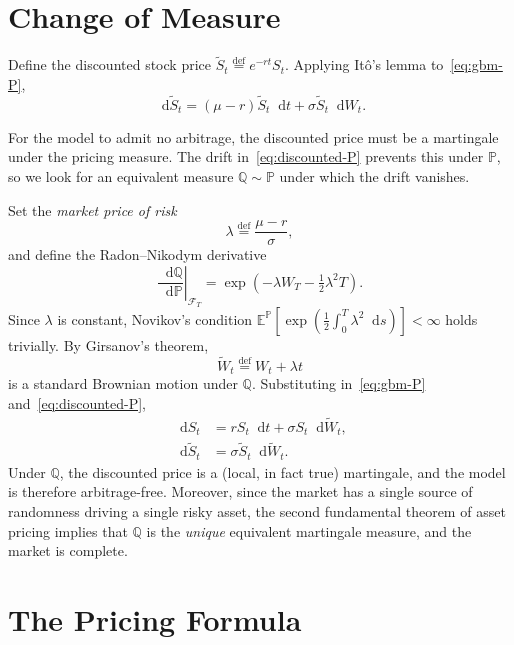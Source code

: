 \documentclass[11pt,a4paper]{article}
\theoremstyle{plain}
\theoremstyle{definition}
\theoremstyle{remark}
\newcommand{\E}{\mathbb{E}}
\newcommand{\F}{\mathcal{F}}
\newcommand{\Prob}{\mathbb{P}}
\newcommand{\Q}{\mathbb{Q}}
\newcommand{\dd}{\mathop{}\!\mathrm{d}}
\newcommand{\eqdef}{\overset{\mathrm{def}}{=}}
\begin{document}
\section{Change of Measure}

Define the discounted stock price \(\tilde{S}_t \eqdef e^{-rt} S_t\).
Applying It\^{o}'s lemma to~\eqref{eq:gbm-P},
\begin{equation}
    \dd \tilde{S}_t
    = (\mu - r) \tilde{S}_t \dd t + \sigma \tilde{S}_t \dd W_t.
    \label{eq:discounted-P}
\end{equation}

For the model to admit no arbitrage, the discounted price must be a
martingale under the pricing measure. The drift in~\eqref{eq:discounted-P}
prevents this under \(\Prob\), so we look for an equivalent measure
\(\Q \sim \Prob\) under which the drift vanishes.

Set the \emph{market price of risk}
\[
    \lambda \eqdef \frac{\mu - r}{\sigma},
\]
and define the Radon--Nikodym derivative
\[
    \left.\frac{\dd \Q}{\dd \Prob}\right|_{\F_T}
    = \exp\!\left(-\lambda W_T - \tfrac{1}{2}\lambda^2 T\right).
\]
Since \(\lambda\) is constant, Novikov's condition
\(\E^{\Prob}\!\left[\exp\!\left(\tfrac{1}{2}\int_0^T \lambda^2 \dd s\right)\right] < \infty\)
holds trivially. By Girsanov's theorem,
\[
    \widetilde{W}_t \eqdef W_t + \lambda t
\]
is a standard Brownian motion under \(\Q\). Substituting
in~\eqref{eq:gbm-P} and~\eqref{eq:discounted-P},
\begin{align}
    \dd S_t
    &= r S_t \dd t + \sigma S_t \dd \widetilde{W}_t,
    \label{eq:gbm-Q} \\
    \dd \tilde{S}_t
    &= \sigma \tilde{S}_t \dd \widetilde{W}_t.
\end{align}
Under \(\Q\), the discounted price is a (local, in fact true) martingale,
and the model is therefore arbitrage-free. Moreover, since the market
has a single source of randomness driving a single risky asset, the
second fundamental theorem of asset pricing implies that \(\Q\) is the
\emph{unique} equivalent martingale measure, and the market is complete.

\section{The Pricing Formula}
\end{document}
